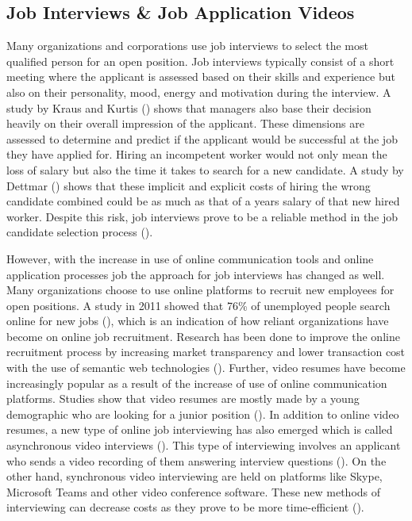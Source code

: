 \subsection{Job Interviews \& Job Application Videos}
Many organizations and corporations use job interviews to select the most qualified person for an open position. Job interviews typically consist of a short meeting where the applicant is assessed based on their skills and experience but also on their personality, mood, energy and motivation during the interview. A study by Kraus and Kurtis (\citeyear{kraus1990creative}) shows that managers also base their decision heavily on their overall impression of the applicant. These dimensions are assessed to determine and predict if the applicant would be successful at the job they have applied for. Hiring an incompetent worker would not only mean the loss of salary but also the time it takes to search for a new candidate. A study by Dettmar (\citeyear{dettmar2004we}) shows that these implicit and explicit costs of hiring the wrong candidate combined could be as much as that of a years salary of that new hired worker. Despite this risk, job interviews prove to be a reliable method in the job candidate selection process (\cite{weekley1987reliability}). 

However, with the increase in use of online communication tools and online application processes job the approach for job interviews has changed as well. Many organizations choose to use online platforms to recruit new employees for open positions. A study in 2011 showed that 76\% of unemployed people search online for new jobs (\cite{faberman2016does}), which is an indication of how reliant organizations have become on online job recruitment. Research has been done to improve the online recruitment process by increasing market transparency and lower transaction cost with the use of semantic web technologies (\cite{bizer2005impact}). Further, video resumes have become increasingly popular as a result of the increase of use of online communication platforms. Studies show that video resumes are mostly made by a young demographic who are looking for a junior position (\cite{nguyen2016hirability}). In addition to online video resumes, a new type of online job interviewing has also emerged which is called asynchronous video interviews (\cite{torres2017asynchronous}). This type of interviewing involves an applicant who sends a video recording of them answering interview questions (\cite{toldi2011jobapplicants}). On the other hand, synchronous video interviewing are held on platforms like Skype, Microsoft Teams and other video conference software. These new methods of interviewing can decrease costs as they prove to be more time-efficient (\cite{weber2012your}).

